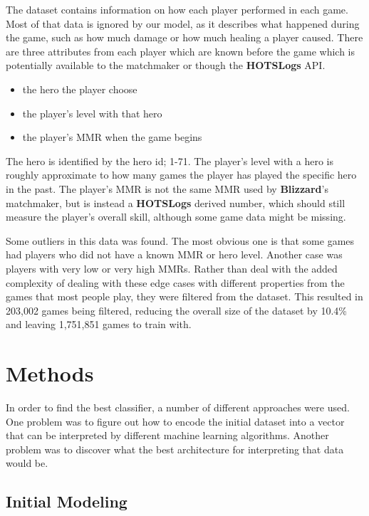 \documentclass[twoside,twocolumn]{article}
\begin{document}
The dataset contains information on how each player performed in each game.  Most of that data is ignored by our model, as it describes what happened during the game, such as how much damage or how much healing a player caused.  There are three attributes from each player which are known before the game which is potentially available to the matchmaker or though the \textbf{HOTSLogs} API.

\begin{itemize}
\item the hero the player choose
\item the player's level with that hero
\item the player's MMR when the game begins
\end{itemize}

The hero is identified by the hero id; 1-71.  The player's level with a hero is roughly approximate to how many games the player has played the specific hero in the past.  The player's MMR is not the same MMR used by \textbf{Blizzard}'s matchmaker, but is instead a \textbf{HOTSLogs} derived number, which should still measure the player's overall skill, although some game data might be missing.

Some outliers in this data was found.  The most obvious one is that some games had players who did not have a known MMR or hero level.  Another case was players with very low or very high MMRs.  Rather than deal with the added complexity of dealing with these edge cases with different properties from the games that most people play, they were filtered from the dataset.  This resulted in 203,002 games being filtered, reducing the overall size of the dataset by 10.4\% and leaving 1,751,851 games to train with.



\section{Methods}

In order to find the best classifier, a number of different approaches were used.  One problem was to figure out how to encode the initial dataset into a vector that can be interpreted by different machine learning algorithms.  Another problem was to discover what the best  architecture for interpreting that data would be.

\subsection{Initial Modeling}
\end{document}
